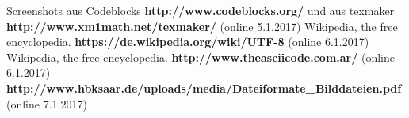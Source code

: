  Screenshots aus Codeblocks \textbf{http://www.codeblocks.org/} und aus texmaker \textbf{http://www.xm1math.net/texmaker/} (online 5.1.2017)
 Wikipedia, the free encyclopedia. \textbf{https://de.wikipedia.org/wiki/UTF-8} (online 6.1.2017)
 Wikipedia, the free encyclopedia. \textbf{http://www.theasciicode.com.ar/} (online 6.1.2017)
 \textbf{http://www.hbksaar.de/uploads/media/Dateiformate\_Bilddateien.pdf} (online 7.1.2017)